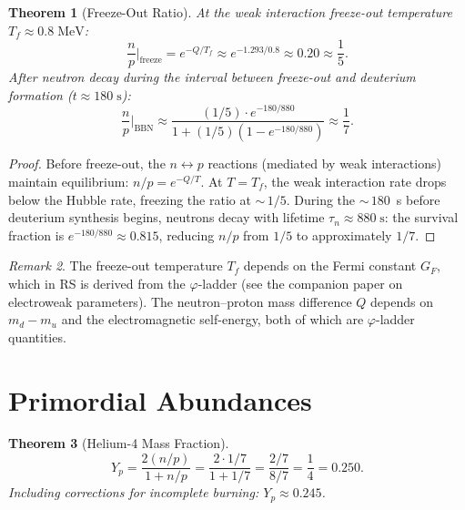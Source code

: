 \documentclass[12pt,a4paper]{article}
\newtheorem{theorem}{Theorem}[section]
\theoremstyle{definition}
\theoremstyle{remark}
\newtheorem{remark}[theorem]{Remark}
\begin{document}
\begin{theorem}[Freeze-Out Ratio]
\label{thm:np}
At the weak interaction freeze-out temperature
$T_f \approx 0.8\;\mathrm{MeV}$:
\begin{equation}
  \frac{n}{p}\bigg|_{\mathrm{freeze}} = e^{-Q/T_f}
  \approx e^{-1.293/0.8} \approx 0.20 \approx \frac{1}{5}.
\end{equation}
After neutron decay during the interval between freeze-out and
deuterium formation ($t \approx 180\;\mathrm{s}$):
\begin{equation}
  \frac{n}{p}\bigg|_{\mathrm{BBN}} \approx
  \frac{(1/5) \cdot e^{-180/880}}{1 + (1/5)(1 - e^{-180/880})}
  \approx \frac{1}{7}.
\end{equation}
\end{theorem}

\begin{proof}
Before freeze-out, the $n \leftrightarrow p$ reactions (mediated by
weak interactions) maintain equilibrium: $n/p = e^{-Q/T}$.  At
$T = T_f$, the weak interaction rate drops below the Hubble rate,
freezing the ratio at ${\sim}\,1/5$.  During the ${\sim}\,180$~s
before deuterium synthesis begins, neutrons decay with lifetime
$\tau_n \approx 880\;\mathrm{s}$: the survival fraction is
$e^{-180/880} \approx 0.815$, reducing $n/p$ from $1/5$ to
approximately $1/7$.
\end{proof}

\begin{remark}
The freeze-out temperature $T_f$ depends on the Fermi constant
$G_F$, which in RS is derived from the $\varphi$-ladder (see the
companion paper on electroweak parameters).  The neutron--proton
mass difference $Q$ depends on $m_d - m_u$ and the electromagnetic
self-energy, both of which are $\varphi$-ladder quantities.
\end{remark}

\section{Primordial Abundances}
\label{sec:abundances}

\begin{theorem}[Helium-4 Mass Fraction]
\label{thm:helium}
\begin{equation}
  Y_p = \frac{2(n/p)}{1 + n/p} = \frac{2 \cdot 1/7}{1 + 1/7}
  = \frac{2/7}{8/7} = \frac{1}{4} = 0.250.
\end{equation}
Including corrections for incomplete burning:
$Y_p \approx 0.245$.
\end{theorem}
\end{document}
